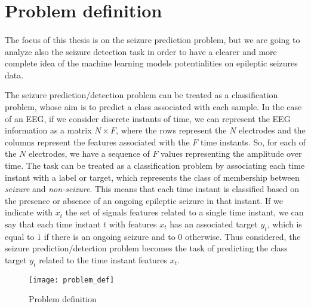 \section{Problem definition} \label{sec: problem_definition}
\paragraph{} The focus of this thesis is on the seizure prediction problem, but we are going to analyze also the seizure detection task in order to have a clearer and more complete idea of the machine learning models potentialities on epileptic seizures data.

The seizure prediction/detection problem can be treated as a classification problem, whose aim is to predict a class associated with each sample. In the case of an EEG, if we consider discrete instants of time, we can represent the EEG information as a matrix $N \times F$, where the rows represent the $N$ electrodes and the columns represent the features associated with the $F$ time instants. So, for each of the $N$ electrodes, we have a sequence of $F$ values representing the amplitude over time. The task can be treated as a classification problem by associating each time instant with a label or target, which represents the class of membership between \textit{seizure} and \textit{non-seizure}. This means that each time instant is classified based on the presence or absence of an ongoing epileptic seizure in that instant. If we indicate with $x_t$ the set of signals features related to a single time instant, we can say that each time instant $t$ with features $x_t$ has an associated target $y_t$, which is equal to $1$ if there is an ongoing seizure and to $0$ otherwise. Thus considered, the seizure prediction/detection problem becomes the task of predicting the class target $y_t$ related to the time instant features $x_t$.

\begin{figure}[htbp]
    \centering
    \texttt{[image: problem\_def]}
    \caption{Problem definition}
    \label{fig:problem_def}
\end{figure}

